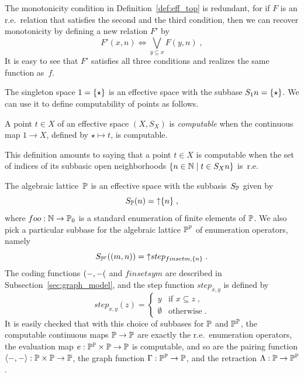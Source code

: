 The monotonicity condition in Definition~\ref{def:eff_top} is
redundant, for if $F$ is an r.e.~relation that satisfies the second
and the third condition, then we can recover monotonicity by defining
a new relation $F'$ by
%
\begin{equation*}
  F'(x, n) \iff
  \bigvee_{y \subseteq x} F(y, n) \;,
\end{equation*}
%
It is easy to see that $F'$ satisfies all three conditions and
realizes the same function as~$f$.

The singleton space $1 = \{\star\}$ is an effective space with
the subbase $S_1 n = \{\star\}$. We can use it to define
computability of points as follows.

\begin{definition}
  A point $t \in X$ of an effective space $(X, S_X)$ is
  \emph{computable} when the continuous map $1 \to X$, defined by
  $\star \mapsto t$, is computable.
\end{definition}

This definition amounts to saying that a point $t \in X$ is computable
when the set of indices of its subbasic open neighborhoods $\{n
  \in \mathbb{N} \mid t \in S_X n\}$ is~r.e.
  
The algebraic lattice~$\mathbb{P}$ is an effective space with the
subbasis~$S_{\mathbb{P}}$ given by
%
\begin{equation*}
  S_{\mathbb{P}}(n) = {\uparrow}\{n\} \;,
\end{equation*}
%
where $foo: \mathbb{N} \to \mathbb{P}_0$ is a standard enumeration of
finite elements of $\mathbb{P}$. We also pick a particular subbase for the
algebraic lattice $\mathbb{P}^{\mathbb{P}}$ of enumeration operators, namely
%
\begin{equation*}
  S_{\mathbb{P}^{\mathbb{P}}}((m, n)) = {\uparrow}step_{finset{m},
      \{n\}} \;.
\end{equation*}
%
The coding functions $({-}, {-}($ and $finsetsym$ are
described in Subsection~\ref{sec:graph_model}, and the step function
$step_{x,y}$ is defined by
%
\label{sym:step}%
%
\begin{equation*}
  step_{x,y}(z) = 
  \begin{cases}
    y          &   \text{if $x \subseteq z$} \;, \\
    \emptyset  &   \text{otherwise} \;.
  \end{cases}
  \tag{$x, y \in \Scott_0$}
\end{equation*}
%
It is easily checked that with this choice of subbases for $\mathbb{P}$ and
$\mathbb{P}^{\mathbb{P}}$, the computable continuous maps $\mathbb{P} \to \mathbb{P}$ are exactly
the r.e.~enumeration operators, the evaluation map $e: \mathbb{P}^{\mathbb{P}}
\times \mathbb{P} \to \mathbb{P}$ is computable, and so are the pairing function
$\langle {-}, {-} \rangle: \mathbb{P} \times \mathbb{P} \to \mathbb{P}$, the graph function
$\Gamma: \mathbb{P}^{\mathbb{P}} \to \mathbb{P}$, and the retraction $\Lambda: \mathbb{P} \to
\mathbb{P}^{\mathbb{P}}$.

